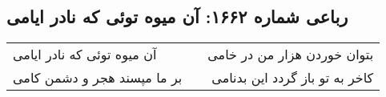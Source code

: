 \begin{center}
\section*{رباعی شماره ۱۶۶۲: آن میوه توئی که نادر ایامی}
\label{sec:1662}
\begin{longtable}{l p{0.5cm} r}
آن میوه توئی که نادر ایامی
&&
بتوان خوردن هزار من در خامی
\\
بر ما مپسند هجر و دشمن کامی
&&
کاخر به تو باز گردد این بدنامی
\\
\end{longtable}
\end{center}
